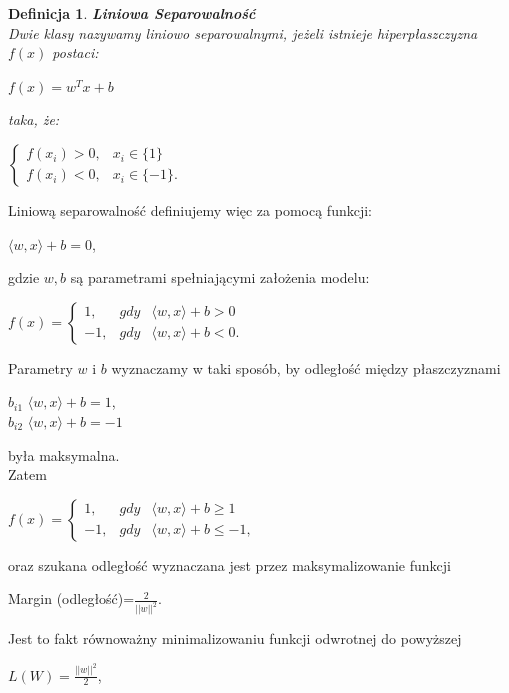 \documentclass[12pt,a4paper]{report}
\newtheorem{df}{Definicja}
\begin{document}
\begin{df}\textbf{Liniowa Separowalność}%
\\Dwie klasy nazywamy liniowo separowalnymi, jeżeli istnieje hiperpłaszczyzna $f(x)$ postaci:
\begin{center}
$f(x) = w^T x +b$
\end{center}
taka, że:
\begin{center}
$\left\{\begin{array}{ll}
f(x_i)>0, &    x_i\in\{1\}\\
f(x_i)<0, &    x_i\in\{-1\}.
\end{array} \right.$
\end{center}
\end{df}
\bigskip
\bigskip
\bigskip
Liniową separowalność definiujemy więc za pomocą funkcji:
\begin{center}
$\langle w,x \rangle + b = 0$, 
\end{center}
gdzie $w, b$ są parametrami spełniającymi założenia modelu:
\begin{center}
$f(x) = 
\left\{\begin{array}{lll}
1, & gdy &   \langle w,x \rangle + b > 0\\
-1, &   gdy &   \langle w,x \rangle + b < 0.
\end{array} \right.$
\end{center}
Parametry $w$ i $b$ wyznaczamy w taki sposób, by odległość między płaszczyznami
\begin{center}
$ b_{i1}$ $\langle w,x \rangle + b = 1$,
\\$ b_{i2}$ $\langle w,x \rangle + b = -1$
\end{center}
była maksymalna.
\\Zatem
\begin{center}
$f(x) = 
\left\{\begin{array}{lll}
1, & gdy &   \langle w,x \rangle + b \geq 1\\
-1, &   gdy &   \langle w,x \rangle + b \leq -1,
\end{array} \right.$
\end{center}
oraz szukana odległość wyznaczana jest przez maksymalizowanie funkcji 
\begin{center}
Margin (odległość)=$\frac{2}{||w||^2}$.
\end{center}
Jest to fakt równoważny minimalizowaniu funkcji odwrotnej do powyższej
\begin{center}
$L(W) = \frac{||w||^2}{2}$,
\end{center}
\end{document}
